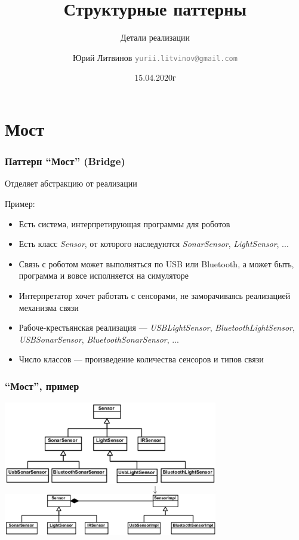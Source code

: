 \documentclass[xetex,mathserif,serif]{beamer}
\title{Структурные паттерны}
\subtitle{Детали реализации}
\author[Юрий Литвинов]{Юрий Литвинов \newline \textcolor{gray}{\small\texttt{yurii.litvinov@gmail.com}}}
\date{15.04.2020г}
\begin{document}
    
    \frame{\titlepage}

    \section{Мост}

    \begin{frame}
        \frametitle{Паттерн ``Мост'' (Bridge)}
        Отделяет абстракцию от реализации

        Пример:
        \begin{itemize}
            \item Есть система, интерпретирующая программы для роботов
            \item Есть класс \textit{Sensor}, от которого наследуются \textit{SonarSensor}, \textit{LightSensor}, ...
            \item Связь с роботом может выполняться по USB или Bluetooth, а может быть, программа и вовсе исполняется на симуляторе
            \item Интерпретатор хочет работать с сенсорами, не заморачиваясь реализацией механизма связи
            \item Рабоче-крестьянская реализация --- \textit{USBLightSensor}, \textit{BluetoothLightSensor}, \textit{USBSonarSensor}, \textit{BluetoothSonarSensor}, ...
            \item Число классов --- произведение количества сенсоров и типов связи
        \end{itemize}
    \end{frame}

    \begin{frame}
        \frametitle{``Мост'', пример}
        \begin{center}
            \includegraphics[width=0.7\textwidth]{noBridge.png}
            \Huge{$$\downarrow$$}
            \includegraphics[width=0.7\textwidth]{bridge.png}
        \end{center}
    \end{frame}
\end{document}
